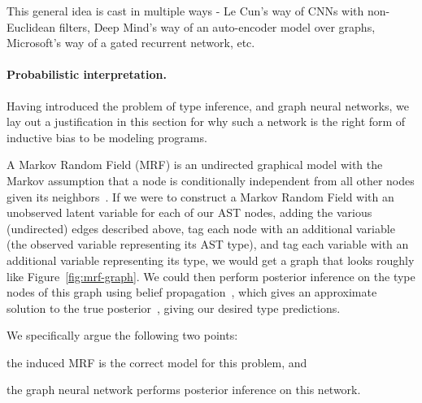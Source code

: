 This general idea is cast in multiple ways - Le Cun's way of CNNs with non-Euclidean filters, Deep Mind's way of an auto-encoder model over graphs, Microsoft's way of a gated recurrent network, etc.


\paragraph{Probabilistic interpretation.}
Having introduced the problem of type inference, and graph neural networks, we lay out a justification in this section for why such a network is the right form of inductive bias to be modeling programs.

A Markov Random Field (MRF) is an undirected graphical model with the Markov assumption that a node is conditionally independent from all other nodes given its neighbors~\cite{kinderman80markov}.
If we were to construct a Markov Random Field with an unobserved latent variable for each of our AST nodes, adding the various (undirected) edges described above, tag each node with an additional variable (the observed variable representing its AST type), and tag each variable with an additional variable representing its type, we would get a graph that looks roughly like Figure~\ref{fig:mrf-graph}.
We could then perform posterior inference on the type nodes of this graph using belief propagation~\cite{pearl2009causality}, which gives an approximate solution to the true posterior~\cite{weiss2000correctness}, giving our desired type predictions.

We specifically argue the following two points:
\begin{enumerate*}[label=(\roman*)]
	\item the induced MRF is the correct model for this problem, and
	\item the graph neural network performs posterior inference on this network.
\end{enumerate*}

